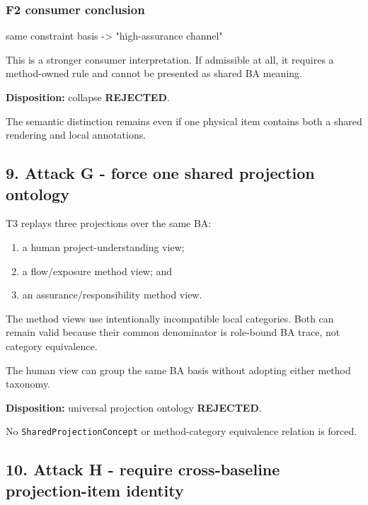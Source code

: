 \documentclass[
  11pt,
  a4paper,
]{article}
\newenvironment{Shaded}{}{}
\newcommand{\NormalTok}[1]{#1}
\providecommand{\tightlist}{%
  \setlength{\itemsep}{0pt}\setlength{\parskip}{0pt}}
\begin{document}
\subsubsection{F2 consumer conclusion}\label{f2-consumer-conclusion}

\begin{Shaded}
\begin{Highlighting}[]
\NormalTok{same constraint basis}
\NormalTok{    {-}\textgreater{} "high{-}assurance channel"}
\end{Highlighting}
\end{Shaded}

This is a stronger consumer interpretation. If admissible at all, it
requires a method-owned rule and cannot be presented as shared BA
meaning.

\textbf{Disposition:} collapse \textbf{REJECTED}.

The semantic distinction remains even if one physical item contains both
a shared rendering and local annotations.

\subsection{9. Attack G - force one shared projection
ontology}\label{attack-g---force-one-shared-projection-ontology}

T3 replays three projections over the same BA:

\begin{enumerate}
\def\labelenumi{\arabic{enumi}.}
\tightlist
\item
  a human project-understanding view;
\item
  a flow/exposure method view; and
\item
  an assurance/responsibility method view.
\end{enumerate}

The method views use intentionally incompatible local categories. Both
can remain valid because their common denominator is role-bound BA
trace, not category equivalence.

The human view can group the same BA basis without adopting either
method taxonomy.

\textbf{Disposition:} universal projection ontology \textbf{REJECTED}.

No \texttt{SharedProjectionConcept} or method-category equivalence
relation is forced.

\subsection{10. Attack H - require cross-baseline projection-item
identity}\label{attack-h---require-cross-baseline-projection-item-identity}
\end{document}
